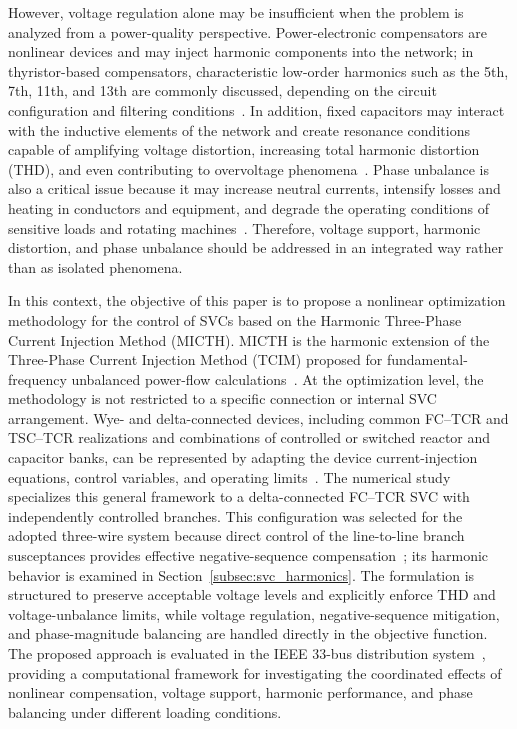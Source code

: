 \documentclass[journal]{IEEEtran}
\begin{document}
However, voltage regulation alone may be insufficient when the problem is analyzed from a power-quality perspective. Power-electronic compensators are nonlinear devices and may inject harmonic components into the network; in thyristor-based compensators, characteristic low-order harmonics such as the 5th, 7th, 11th, and 13th are commonly discussed, depending on the circuit configuration and filtering conditions~\cite{Kraimia2021SVCHarmonics,Zheng2021SVCHarmonicFailure}. In addition, fixed capacitors may interact with the inductive elements of the network and create resonance conditions capable of amplifying voltage distortion, increasing total harmonic distortion (THD), and even contributing to overvoltage phenomena~\cite{Farzin2022CapacitorResonance}. Phase unbalance is also a critical issue because it may increase neutral currents, intensify losses and heating in conductors and equipment, and degrade the operating conditions of sensitive loads and rotating machines~\cite{Liu2020SVCUnbalance}. Therefore, voltage support, harmonic distortion, and phase unbalance should be addressed in an integrated way rather than as isolated phenomena.

In this context, the objective of this paper is to propose a nonlinear optimization methodology for the control of SVCs based on the Harmonic Three-Phase Current Injection Method (MICTH). MICTH is the harmonic extension of the Three-Phase Current Injection Method (TCIM) proposed for fundamental-frequency unbalanced power-flow calculations~\cite{garcia2000three,Arruda2003}. At the optimization level, the methodology is not restricted to a specific connection or internal SVC arrangement. Wye- and delta-connected devices, including common FC--TCR and TSC--TCR realizations and combinations of controlled or switched reactor and capacitor banks, can be represented by adapting the device current-injection equations, control variables, and operating limits~\cite{MathurVarma2002,IEEE1031_2011}. The numerical study specializes this general framework to a delta-connected FC--TCR SVC with independently controlled branches. This configuration was selected for the adopted three-wire system because direct control of the line-to-line branch susceptances provides effective negative-sequence compensation~\cite{Chen1999SVCBalance}; its harmonic behavior is examined in Section~\ref{subsec:svc_harmonics}. The formulation is structured to preserve acceptable voltage levels and explicitly enforce THD and voltage-unbalance limits, while voltage regulation, negative-sequence mitigation, and phase-magnitude balancing are handled directly in the objective function. The proposed approach is evaluated in the IEEE 33-bus distribution system~\cite{dolatabadi2021}, providing a computational framework for investigating the coordinated effects of nonlinear compensation, voltage support, harmonic performance, and phase balancing under different loading conditions.
\end{document}
